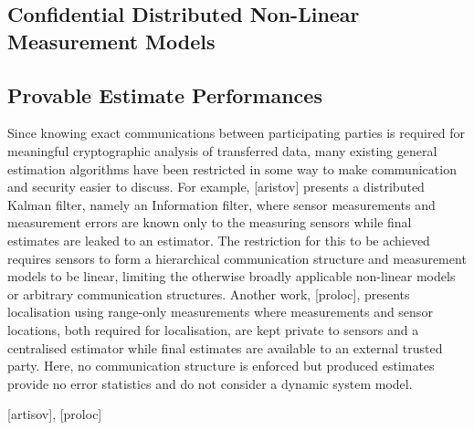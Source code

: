 % 
% 

\subsection{Confidential Distributed Non-Linear Measurement Models}\label{subsec:intro:conf_nonlin_measurements}

% 
% 

\subsection{Provable Estimate Performances}\label{subsec:intro:provable_est_perf}

Since knowing exact communications between participating parties is required for meaningful cryptographic analysis of transferred data, many existing general estimation algorithms have been restricted in some way to make communication and security easier to discuss. For example, [aristov] presents a distributed Kalman filter, namely an Information filter, where sensor measurements and measurement errors are known only to the measuring sensors while final estimates are leaked to an estimator. The restriction for this to be achieved requires sensors to form a hierarchical communication structure and measurement models to be linear, limiting the otherwise broadly applicable non-linear models or arbitrary communication structures. Another work, [proloc], presents localisation using range-only measurements where measurements and sensor locations, both required for localisation, are kept private to sensors and a centralised estimator while final estimates are available to an external trusted party. Here, no communication structure is enforced but produced estimates provide no error statistics and do not consider a dynamic system model.


[artisov], [proloc]

